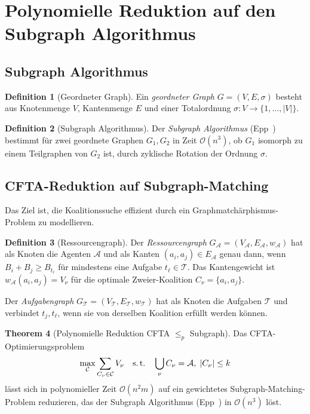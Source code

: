 ﻿\documentclass[a4paper,12pt]{article}
\theoremstyle{definition}
\newtheorem{definition}{Definition}[section]
\newtheorem{theorem}[definition]{Theorem}
\newcommand{\calA}{\mathcal{A}}
\newcommand{\calT}{\mathcal{T}}
\newcommand{\calC}{\mathcal{C}}
\begin{document}
\section{Polynomielle Reduktion auf den Subgraph Algorithmus}
\label{sec:subgraph}

\subsection{Subgraph Algorithmus}

\begin{definition}[Geordneter Graph]
Ein \emph{geordneter Graph} $G = (V, E, \sigma)$ besteht aus
Knotenmenge $V$, Kantenmenge $E$ und einer Totalordnung
$\sigma : V \to \{1,\ldots,|V|\}$.
\end{definition}

\begin{definition}[Subgraph Algorithmus]
Der \emph{Subgraph Algorithmus} (Epp~\cite{Epp2026}) bestimmt f\"ur zwei
geordnete Graphen $G_1, G_2$ in Zeit $\mathcal{O}(n^3)$, ob $G_1$
isomorph zu einem Teilgraphen von $G_2$ ist, durch zyklische Rotation der
Ordnung $\sigma$.
\end{definition}

\subsection{CFTA-Reduktion auf Subgraph-Matching}

Das Ziel ist, die Koalitionssuche effizient durch ein Graphmatch\"arphismus-Problem
zu modellieren.

\begin{definition}[Ressourcengraph]
Der \emph{Ressourcengraph} $G_{\calA} = (V_{\calA}, E_{\calA}, w_{\calA})$
hat als Knoten die Agenten $\calA$ und als Kanten
$(a_i, a_j) \in E_{\calA}$ genau dann, wenn
$B_i + B_j \geq B_{t_\ell}$ f\"ur mindestens eine Aufgabe $t_\ell \in \calT$.
Das Kantengewicht ist $w_{\calA}(a_i,a_j) = V_\nu$ f\"ur die optimale
Zweier-Koalition $C_\nu = \{a_i,a_j\}$.

Der \emph{Aufgabengraph} $G_{\calT} = (V_{\calT}, E_{\calT}, w_{\calT})$
hat als Knoten die Aufgaben $\calT$ und verbindet $t_j, t_\ell$, wenn sie
von derselben Koalition erf\"ullt werden k\"onnen.
\end{definition}

\begin{theorem}[Polynomielle Reduktion CFTA $\leq_p$ Subgraph]
\label{thm:reduction}
Das CFTA-Optimierungs\-problem
\begin{equation}
  \max_{\calC} \sum_{C_\nu \in \calC} V_\nu
  \quad \text{s.\,t.}\quad \bigcup_\nu C_\nu = \calA,\;
  |C_\nu| \leq k
  \label{eq:cfta_opt}
\end{equation}
l\"asst sich in polynomieller Zeit $\mathcal{O}(n^2 m)$ auf ein
gewichtetes Subgraph-Matching-Problem reduzieren, das der Subgraph Algorithmus
(Epp~\cite{Epp2026}) in $\mathcal{O}(n^3)$ l\"ost.
\end{theorem}
\end{document}
